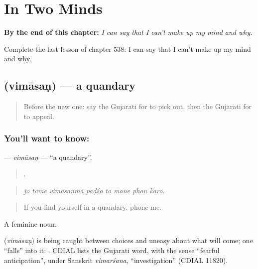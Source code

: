 
\chapter{In Two Minds}
\label{ch:gu-in-two-minds}

\begin{chapteropening}
\textbf{By the end of this chapter:} \emph{I can say that I can't make up my mind and why.}

Complete the last lesson of chapter 538: I can say that I can't make up my mind and why.
\end{chapteropening}

\section[\texorpdfstring{\gu{વિમાસણ} (vimāsaṇ)}{વિમાસણ (vimāsaṇ)}]{ (vimāsaṇ) — a quandary}

\label{lesson:GU-C538-vimasan}



\begin{quote}
Before the new one: say the Gujarati for to pick out, then the Gujarati for to appeal.
\end{quote}

\subsection*{You'll want to know: }
\textbf{} — \emph{vimāsaṇ} — \textquotedblleft{}a quandary\textquotedblright{}.

\begin{quote}
       .
\end{quote}

\begin{quote}
\emph{jo tame vimāsaṇmā̃ paḍśo to mane phon karo.}
\end{quote}

\begin{quote}
If you find yourself in a quandary, phone me.
\end{quote}

A feminine noun.

\begin{cousinweb}
\textbf{} (\emph{vimāsaṇ}) is being caught between choices and uneasy about what will come; one \textquotedblleft{}falls\textquotedblright{} into it: \textbf{ }. CDIAL lists the Gujarati word, with the sense \textquotedblleft{}fearful anticipation\textquotedblright{}, under Sanskrit \emph{vimarśana}, \textquotedblleft{}investigation\textquotedblright{} (CDIAL 11820).
\end{cousinweb}

